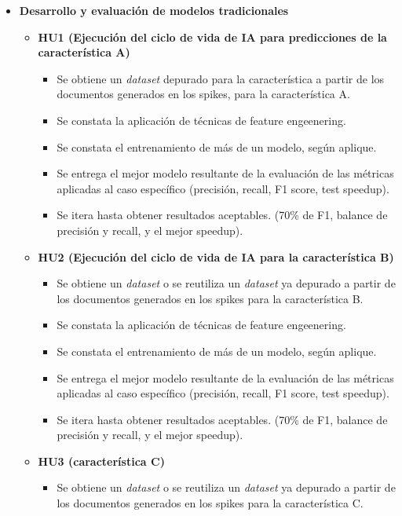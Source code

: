 \documentclass[
11pt, %
]{charter}
\begin{document}
\begin{itemize}
  \item \textbf{Desarrollo y evaluación de modelos tradicionales}
    \begin{itemize}
      \item \textbf{HU1 (Ejecución del ciclo de vida de IA para predicciones de la característica A)}
      \begin{itemize}
        \item Se obtiene un \textit{dataset} depurado para la característica a partir de los documentos generados en los spikes, para la característica A.  
        \item Se constata la aplicación de técnicas de feature engeenering. 
        \item Se constata el entrenamiento de más de un modelo, según aplique.
        \item Se entrega el mejor modelo resultante de la evaluación de las métricas aplicadas al caso específico (precisión, recall, F1 score, test speedup).
        \item Se itera hasta obtener resultados aceptables. (70\% de F1, balance de precisión y recall, y el mejor speedup).
      \end{itemize}
      \item \textbf{HU2 (Ejecución del ciclo de vida de IA para la característica B)}
      \begin{itemize}
        \item Se obtiene un \textit{dataset} o se reutiliza un \textit{dataset} ya depurado a partir de los documentos generados en los spikes para la característica B.  
        \item Se constata la aplicación de técnicas de feature engeenering. 
        \item Se constata el entrenamiento de más de un modelo, según aplique.
        \item Se entrega el mejor modelo resultante de la evaluación de las métricas aplicadas al caso específico (precisión, recall, F1 score, test speedup).
        \item Se itera hasta obtener resultados aceptables. (70\% de F1, balance de precisión y recall, y el mejor speedup).
      \end{itemize}
      \item \textbf{HU3 (característica C)}
      \begin{itemize}
        \item Se obtiene un \textit{dataset} o se reutiliza un \textit{dataset} ya depurado a partir de los documentos generados en los spikes para la característica C.  

\end{itemize}
\end{itemize}
\end{itemize}
\end{document}
